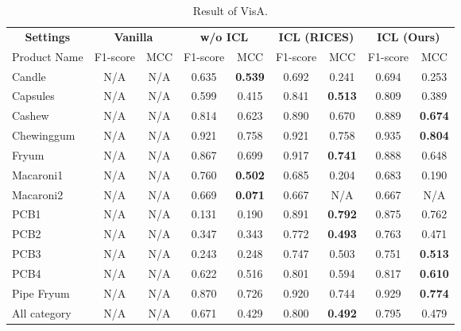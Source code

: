 \begin{table*}[!tb]
\caption{Result of VisA.}
\label{tab:result_visa}
\centering
\begin{tabular}{lcccccccc}
\toprule
\multicolumn{1}{c}{\textbf{Settings}} & \multicolumn{2}{c}{\textbf{Vanilla}} & \multicolumn{2}{c}{\textbf{w/o ICL}} & \multicolumn{2}{c}{\textbf{ICL (RICES)}} & \multicolumn{2}{c}{\textbf{ICL (Ours)}} \\
\cmidrule(r){1-9}
\multicolumn{1}{c}{Product Name} & F1-score & MCC & F1-score & MCC & F1-score & MCC & F1-score & MCC \\
\midrule
Candle & N/A & N/A & 0.635 & \textbf{0.539} & 0.692 & 0.241 & 0.694 & 0.253  \\
Capsules & N/A & N/A & 0.599 & 0.415 & 0.841 & \textbf{0.513} & 0.809 & 0.389 \\
Cashew & N/A & N/A & 0.814 & 0.623 & 0.890 & 0.670 & 0.889 & \textbf{0.674} \\
Chewinggum & N/A & N/A & 0.921 & 0.758 & 0.921 & 0.758 & 0.935 & \textbf{0.804} \\
Fryum & N/A & N/A & 0.867 & 0.699 & 0.917 & \textbf{0.741} & 0.888 & 0.648 \\
Macaroni1 & N/A & N/A & 0.760 & \textbf{0.502} & 0.685 & 0.204 & 0.683 & 0.190 \\
Macaroni2 & N/A & N/A & 0.669 & \textbf{0.071} & 0.667 & N/A & 0.667 & N/A \\
PCB1 & N/A & N/A & 0.131 & 0.190 & 0.891 & \textbf{0.792} & 0.875 & 0.762 \\
PCB2 & N/A & N/A & 0.347 & 0.343 & 0.772 & \textbf{0.493} & 0.763 & 0.471 \\
PCB3 & N/A & N/A & 0.243 & 0.248 & 0.747 & 0.503 & 0.751 & \textbf{0.513} \\
PCB4 & N/A & N/A & 0.622 & 0.516 & 0.801 & 0.594 & 0.817 & \textbf{0.610} \\
Pipe Fryum & N/A & N/A & 0.870 & 0.726 & 0.920 & 0.744 & 0.929 & \textbf{0.774} \\
\cmidrule(r){1-9}
All category & N/A & N/A & 0.671 & 0.429 & 0.800 & \textbf{0.492} & 0.795 & 0.479 \\
\bottomrule
\end{tabular}
\end{table*}